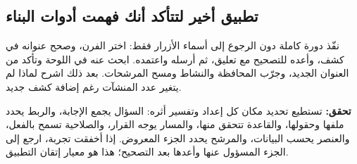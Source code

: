 \subsection{تطبيق أخير لتتأكد أنك فهمت أدوات البناء}

نفّذ دورة كاملة دون الرجوع إلى أسماء الأزرار فقط: اختر الفرن، وصحح عنوانه في كشف، وأعده للتصحيح مع تعليق، ثم أرسله واعتمده. ابحث عنه في اللوحة وتأكد من العنوان الجديد، وجرّب المحافظة والنشاط ومسح المرشحات. بعد ذلك اشرح لماذا لم يتغير عدد المنشآت رغم إضافة كشف جديد.

\textbf{تحقق:} تستطيع تحديد مكان كل إعداد وتفسير أثره: السؤال يجمع الإجابة، والربط يحدد ملفها وحقولها، والقاعدة تتحقق منها، والمسار يوجه القرار، والصلاحية تسمح بالفعل، والعنصر يحسب البيانات، والمرشح يحدد الجزء المعروض. إذا أخفقت تجربة، ارجع إلى الجزء المسؤول عنها وأعدها بعد التصحيح؛ هذا هو معيار إتقان التطبيق.
